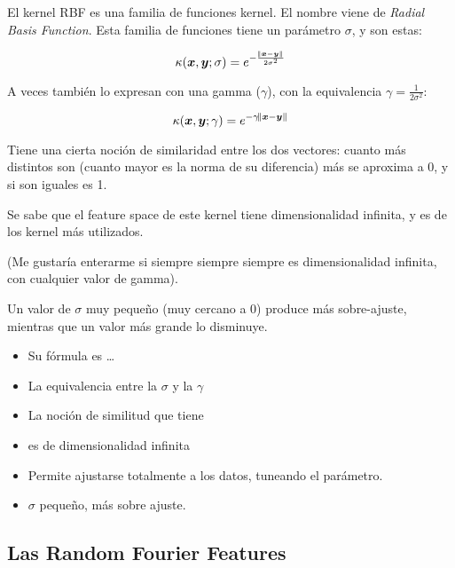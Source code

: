 El kernel RBF es una familia de funciones kernel. El nombre viene de
\textit{Radial Basis Function}. Esta familia de funciones tiene un parámetro
$\sigma$, y son estas:

\begin{equation}
 \kappa({\bm{x}, \bm{y}}; \sigma) = e^{-\frac{\norm{\bm{x} - \bm{y}}}{2\sigma^2}}
\end{equation}

A veces también lo expresan con una gamma ($\gamma$), con la equivalencia
$\gamma = \frac{1}{2\sigma^2}$:

\begin{equation}
 \kappa({\bm{x}, \bm{y}}; \gamma) = e^{-\gamma\norm{\bm{x} - \bm{y}}}
\end{equation}

Tiene una cierta noción de similaridad entre los dos vectores: cuanto más
distintos son (cuanto mayor es la norma de su diferencia) más se aproxima a 0,
y si son iguales es 1.


Se sabe que el feature space de este kernel tiene dimensionalidad infinita, y
es de los kernel más utilizados.

(Me gustaría enterarme si siempre siempre siempre es dimensionalidad infinita,
con cualquier valor de gamma).

Un valor de $\sigma$ muy pequeño (muy cercano a 0) produce más sobre-ajuste,
mientras que un valor más grande lo disminuye.

\begin{note}
  \begin{itemize}
    \item Su fórmula es \ldots
    \item La equivalencia entre la $\sigma$ y la $\gamma$
    \item La noción de similitud que tiene
    \item \Hspace es de dimensionalidad infinita
    \item Permite ajustarse totalmente a los datos, tuneando el parámetro.
    \item $\sigma$ pequeño, más sobre ajuste.
  \end{itemize}
\end{note}


\subsection{Las Random Fourier Features}

